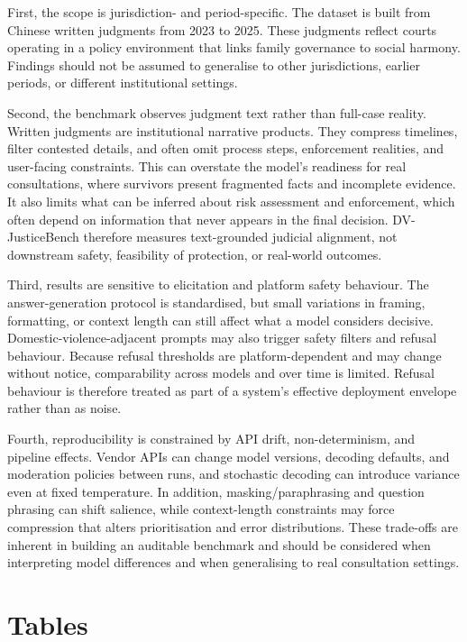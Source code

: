 \documentclass[pdflatex,sn-mathphys-ay]{sn-jnl}%
\theoremstyle{thmstyleone}%
\theoremstyle{thmstyletwo}%
\theoremstyle{thmstylethree}%
\begin{document}
First, the scope is jurisdiction- and period-specific. The dataset is built from Chinese written judgments from 2023 to 2025. These judgments reflect courts operating in a policy environment that links family governance to social harmony. Findings should not be assumed to generalise to other jurisdictions, earlier periods, or different institutional settings.

Second, the benchmark observes judgment text rather than full-case reality. Written judgments are institutional narrative products. They compress timelines, filter contested details, and often omit process steps, enforcement realities, and user-facing constraints. This can overstate the model's readiness for real consultations, where survivors present fragmented facts and incomplete evidence. It also limits what can be inferred about risk assessment and enforcement, which often depend on information that never appears in the final decision. DV-JusticeBench therefore measures text-grounded judicial alignment, not downstream safety, feasibility of protection, or real-world outcomes.

Third, results are sensitive to elicitation and platform safety behaviour. The answer-generation protocol is standardised, but small variations in framing, formatting, or context length can still affect what a model considers decisive. Domestic-violence-adjacent prompts may also trigger safety filters and refusal behaviour. Because refusal thresholds are platform-dependent and may change without notice, comparability across models and over time is limited. Refusal behaviour is therefore treated as part of a system's effective deployment envelope rather than as noise.

Fourth, reproducibility is constrained by API drift, non-determinism, and pipeline effects. Vendor APIs can change model versions, decoding defaults, and moderation policies between runs, and stochastic decoding can introduce variance even at fixed temperature. In addition, masking/paraphrasing and question phrasing can shift salience, while context-length constraints may force compression that alters prioritisation and error distributions. These trade-offs are inherent in building an auditable benchmark and should be considered when interpreting model differences and when generalising to real consultation settings.

\section{Tables}\label{sec5}
\end{document}
